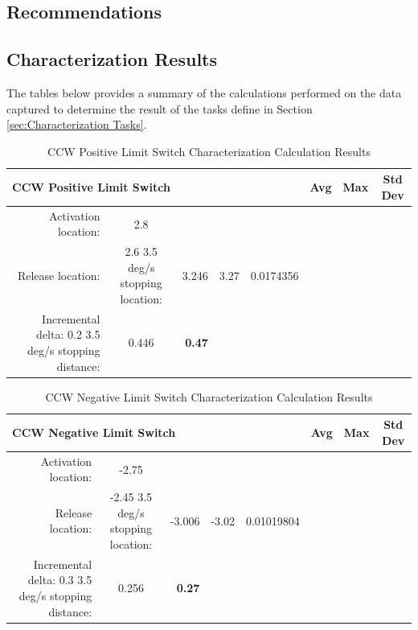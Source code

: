 \documentclass[SE,lsstdraft,authoryear,toc]{lsstdoc}
\begin{document}
\begin{landscape}
\section{Recommendations}

\subsection{Characterization Results}

The tables below provides a summary of the calculations performed on the
data captured to determine the result of the tasks define in Section \ref{sec:Characterization Tasks}.

\begin{table}[h!]
  \begin{center}
    \caption{CCW Positive Limit Switch Characterization Calculation Results}
    \label{tab:table1}
    \begin{tabular}{r|c|r|c|r|c|c|c}
    \multicolumn{5}{l|}{\textbf{CCW Positive Limit Switch}} & Avg & Max & Std Dev\\
    \midrule
    Activation location: & 2.8 & & & & & & \\
    Release location: & 2.6 3.5 deg/s stopping location: & 3.246 & 3.27 & 0.0174356 \\
    Incremental delta: 0.2 3.5 deg/s stopping distance: & 0.446 & \textbf{0.47} & \\
    \end{tabular}
  \end{center}
\end{table}

\begin{table}[h!]
  \begin{center}
    \caption{CCW Negative Limit Switch Characterization Calculation Results}
    \label{tab:table2}
    \begin{tabular}{r|c|r|c|r|c|c|c}
    \multicolumn{5}{l|}{\textbf{CCW Negative Limit Switch}} & Avg & Max & Std Dev\\
    \midrule
    Activation location: & -2.75 & & & & & & \\
    Release location: & -2.45 3.5 deg/s stopping location: & -3.006 & -3.02 & 0.01019804 \\
    Incremental delta: 0.3 3.5 deg/s stopping distance: & 0.256 & \textbf{0.27} & \\
    \end{tabular}
  \end{center}
\end{table}


\end{landscape}
\end{document}
